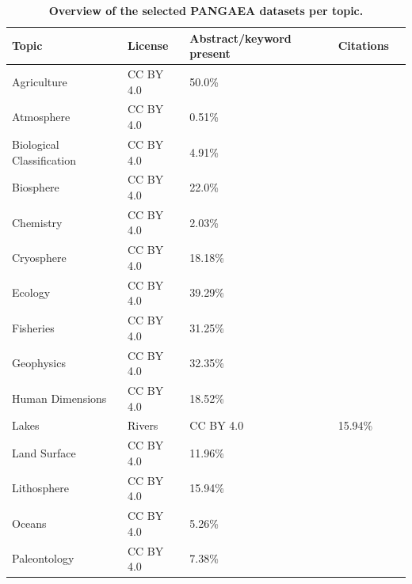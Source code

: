 \begin{table}
\caption{\textbf{Overview of the selected PANGAEA datasets per topic.}}
\label{tab:pangaea_overview}
\begin{tabular}{llll}
\toprule
Topic & License & Abstract/keyword present & Citations \\
\midrule
Agriculture & CC BY 4.0 & 50.0\% & \cite{rantala2026lpdo,rczkowska2024batt,rantala2026lpac,vonsuchodoletz2025adoa,rantala2026xfcs} \\
Atmosphere & CC BY 4.0 & 0.51\% & \cite{gottschalk2021tbmm,plenzler2024dmdf,bagheridastgerdi2021cswv,weller2020asdb,weller2020asdb} \\
Biological Classification & CC BY 4.0 & 4.91\% & \cite{kress2022ssit,forster2026sdom,hill2025proc,knebel2024migd,knebel2024migd} \\
Biosphere & CC BY 4.0 & 22.0\% & \cite{greiffenhagen2026toca,greiffenhagen2026toca,meng2019scca,apnmolina2020msot,kurihara2008scca} \\
Chemistry & CC BY 4.0 & 2.03\% & \cite{martnezbraceras2024wmot,schmidt2023pgos,schmidt2023pgos,strasser2025xdrf,zeppenfeld2021iiis} \\
Cryosphere & CC BY 4.0 & 18.18\% & \cite{obu2019gtma,banerjee2022icoc,hecht2024sdpa,hoppe2026caci,brown2024sdfs} \\
Ecology & CC BY 4.0 & 39.29\% & \cite{mckenzie2023ssba,dasadhikari2019ecia,burkhardt2020wsdp,anhaus2023qpfa,miller2025aaar} \\
Fisheries & CC BY 4.0 & 31.25\% & \cite{grimaldo2021uvrd,apnmolina2020pmit,miller2023scca,schaafsma2024iopc,dring2019dose} \\
Geophysics & CC BY 4.0 & 32.35\% & \cite{albers2024gobf,massari2026hmco,kster2021albo,girard2025upps,spruzen2024acop} \\
Human Dimensions & CC BY 4.0 & 18.52\% & \cite{zentenohernndez2021rdfp,juhls2021swio,beard2024eroc,matsuoka2021fdom,prezcrdenas2024sdoa} \\
Lakes & Rivers & CC BY 4.0 & 15.94\% & \cite{elbizri2019ilcf,serbu2023ppmt,lauer2025ldos,kuwano2024iatp,kokfelt2021ados} \\
Land Surface & CC BY 4.0 & 11.96\% & \cite{miller2019bpdf,miller2019bpdf,nrnberg2025scao,selsam2025sciv,selsam2025sciv} \\
Lithosphere & CC BY 4.0 & 15.94\% & \cite{bittig2023arpc,rettelbach2024said,bohm2020nsse,moore2023ccoa,yabuki2023caom} \\
Oceans & CC BY 4.0 & 5.26\% & \cite{greiffenhagen2026toca,milan2024pcaa,ricardodefreitas2025seas,gebhardt2025rppm,lskow2024ecar} \\
Paleontology & CC BY 4.0 & 7.38\% & \cite{volz2026bbsc,volz2026bbsc,klyuvitkina2026coda,decastro2025cgas,fragaferreira2024eaid} \\
\bottomrule
\end{tabular}
\end{table}
